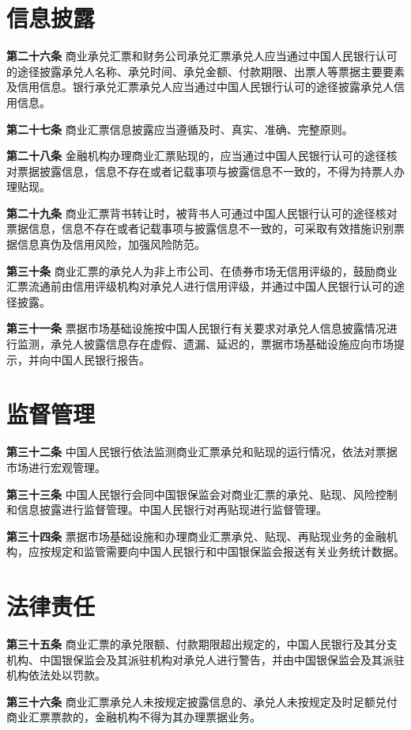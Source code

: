 \section{信息披露}

{\bf 第二十六条} 商业承兑汇票和财务公司承兑汇票承兑人应当通过中国人民银行认可的途径披露承兑人名称、承兑时间、承兑金额、付款期限、出票人等票据主要要素及信用信息。银行承兑汇票承兑人应当通过中国人民银行认可的途径披露承兑人信用信息。

{\bf 第二十七条} 商业汇票信息披露应当遵循及时、真实、准确、完整原则。

{\bf 第二十八条} 金融机构办理商业汇票贴现的，应当通过中国人民银行认可的途径核对票据披露信息，信息不存在或者记载事项与披露信息不一致的，不得为持票人办理贴现。

{\bf 第二十九条} 商业汇票背书转让时，被背书人可通过中国人民银行认可的途径核对票据信息，信息不存在或者记载事项与披露信息不一致的，可采取有效措施识别票据信息真伪及信用风险，加强风险防范。

{\bf 第三十条} 商业汇票的承兑人为非上市公司、在债券市场无信用评级的，鼓励商业汇票流通前由信用评级机构对承兑人进行信用评级，并通过中国人民银行认可的途径披露。

{\bf 第三十一条} 票据市场基础设施按中国人民银行有关要求对承兑人信息披露情况进行监测，承兑人披露信息存在虚假、遗漏、延迟的，票据市场基础设施应向市场提示，并向中国人民银行报告。

\section{监督管理}

{\bf 第三十二条} 中国人民银行依法监测商业汇票承兑和贴现的运行情况，依法对票据市场进行宏观管理。

{\bf 第三十三条} 中国人民银行会同中国银保监会对商业汇票的承兑、贴现、风险控制和信息披露进行监督管理。中国人民银行对再贴现进行监督管理。

{\bf 第三十四条} 票据市场基础设施和办理商业汇票承兑、贴现、再贴现业务的金融机构，应按规定和监管需要向中国人民银行和中国银保监会报送有关业务统计数据。

\section{法律责任}

{\bf 第三十五条} 商业汇票的承兑限额、付款期限超出规定的，中国人民银行及其分支机构、中国银保监会及其派驻机构对承兑人进行警告，并由中国银保监会及其派驻机构依法处以罚款。

{\bf 第三十六条} 商业汇票承兑人未按规定披露信息的、承兑人未按规定及时足额兑付商业汇票票款的，金融机构不得为其办理票据业务。


